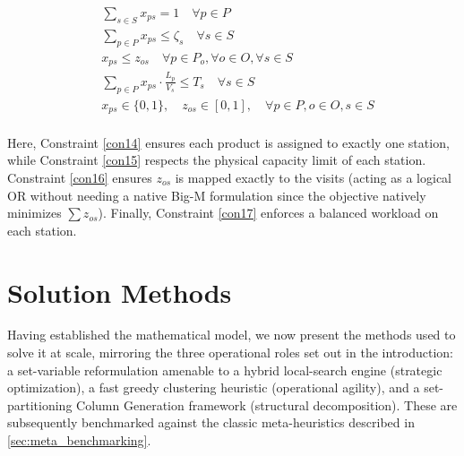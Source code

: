 \documentclass[preprint,review,11pt,authoryear]{elsarticle}
\begin{document}
\begin{align}
&\sum_{s \in S} x_{ps} = 1 \quad \forall p \in P \label{con14}\\
&\sum_{p \in P} x_{ps} \leq \zeta_s \quad \forall s \in S \label{con15}\\
&x_{ps} \leq z_{os} \quad \forall p \in P_o, \forall o \in O, \forall s \in S \label{con16}\\
&\sum_{p \in P} x_{ps} \cdot \frac{L_p}{V_s} \leq T_s \quad \forall s \in S \label{con17}\\
&x_{ps} \in \{0, 1\}, \quad z_{os} \in [0,1], \quad \forall p \in P, o \in O, s \in S 
\end{align}
\\
\noindent Here, Constraint \eqref{con14} ensures each product is assigned to exactly one station, while Constraint \eqref{con15} respects the physical capacity limit of each station. Constraint \eqref{con16} ensures $z_{os}$ is mapped exactly to the visits (acting as a logical OR without needing a native Big-M formulation since the objective natively minimizes $\sum z_{os}$). Finally, Constraint \eqref{con17} enforces a balanced workload on each station.

\section{Solution Methods}\label{sec:methodology}

Having established the mathematical model, we now present the methods used to solve it at scale, mirroring the three operational roles set out in the introduction: a set-variable reformulation amenable to a hybrid local-search engine (strategic optimization), a fast greedy clustering heuristic (operational agility), and a set-partitioning Column Generation framework (structural decomposition). These are subsequently benchmarked against the classic meta-heuristics described in \cref{sec:meta_benchmarking}.
\end{document}
